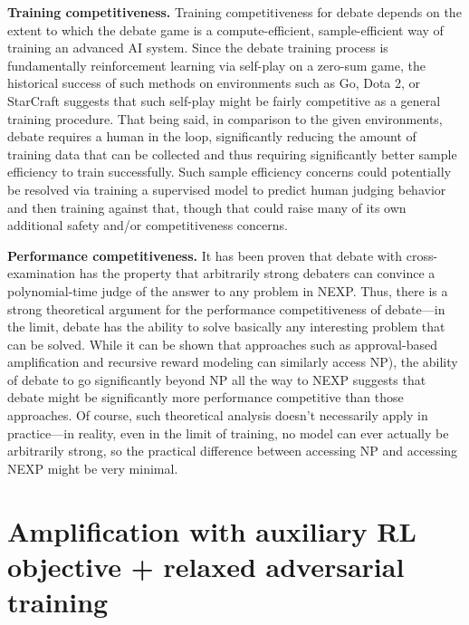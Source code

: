 \documentclass[
  onecolumn,
  natbib,
]{miri-tech-article}
\begin{document}
\textbf{Training competitiveness.} Training competitiveness for debate depends on the extent to which the debate game is a compute-efficient, sample-efficient way of training an advanced AI system. Since the debate training process is fundamentally reinforcement learning via self-play on a zero-sum game, the historical success of such methods on environments such as Go\cite{TODO: cite https://deepmind.com/blog/article/alphazero-shedding-new-light-grand-games-chess-shogi-and-go}, Dota 2\cite{TODO: cite https://openai.com/blog/openai-five/}, or StarCraft\cite{TODO: cite https://deepmind.com/blog/article/alphastar-mastering-real-time-strategy-game-starcraft-ii} suggests that such self-play might be fairly competitive as a general training procedure. That being said, in comparison to the given environments, debate requires a human in the loop, significantly reducing the amount of training data that can be collected and thus requiring significantly better sample efficiency to train successfully. Such sample efficiency concerns could potentially be resolved via training a supervised model to predict human judging behavior and then training against that, though that could raise many of its own additional safety and/or competitiveness concerns.

\textbf{Performance competitiveness.} It has been proven\cite{TODO: cite https://www.alignmentforum.org/posts/Br4xDbYu4Frwrb64a/writeup-progress-on-ai-safety-via-debate-1} that debate with cross-examination has the property that arbitrarily strong debaters can convince a polynomial-time judge of the answer to any problem in NEXP\cite{TODO: cite https://en.wikipedia.org/wiki/NEXPTIME}. Thus, there is a strong theoretical argument for the performance competitiveness of debate---in the limit, debate has the ability to solve basically any interesting problem that can be solved. While it can be shown that approaches such as approval-based amplification and recursive reward modeling can similarly access NP\cite{TODO: cite https://en.wikipedia.org/wiki/NP_(complexity}), the ability of debate to go significantly beyond NP all the way to NEXP suggests that debate might be significantly more performance competitive than those approaches. Of course, such theoretical analysis doesn't necessarily apply in practice---in reality, even in the limit of training, no model can ever actually be arbitrarily strong, so the practical difference between accessing NP and accessing NEXP might be very minimal.

\section{Amplification with auxiliary RL objective + relaxed adversarial training}
\label{sec:10}
\end{document}
